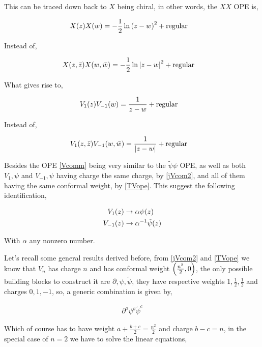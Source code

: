 This can be traced down back to $X$ being chiral, in other words, the $XX$ OPE is,

\begin{align*}
    X\qty(z)X\qty(w)&=-\frac12\ln\qty(z-w)^2+\textnormal{regular}
\end{align*}

Instead of,

\begin{align*}
    X\qty(z,\bar z)X\qty(w,\bar w)&=-\frac12\ln\abs{z-w}^2+\textnormal{regular}
\end{align*}

What gives rise to,

\begin{align*}
    V_1\qty(z)V_{-1}\qty(w)&=\frac{1}{z-w}+\textnormal{regular}
\end{align*}

Instead of,

\begin{align*}
    V_1\qty(z,\bar z)V_{-1}\qty(w,\bar w)&=\frac{1}{\abs{z-w}}+\textnormal{regular}
\end{align*}

Besides the OPE \ref{Vcomm} being very similar to the $\tilde\psi\psi$ OPE, as well as 
both $V_1,\psi$ and $V_{-1},\psi$ having charge the same charge, by \ref{jVcom2}, and all of them having the same conformal weight, 
by \ref{TVope}. This suggest the following identification,

\begin{align*}
    V_1\qty(z)&\rightarrow\alpha\psi\qty(z)\\
    V_{-1}\qty(z)&\rightarrow\alpha^{-1}\tilde\psi\qty(z)
\end{align*}

With $\alpha$ any nonzero number.

\probitem{}

Let's recall some general results derived before, from \ref{jVcom2} and \ref{TVope} we know that $V_n$ has 
charge $n$ and has conformal weight $\qty(\frac{n^2}{2},0)$, the only possible building blocks to construct it 
are $\partial,\psi,\tilde\psi$, they have respective weights $1,\frac12,\frac12$ and charges $0,1,-1$, so, a generic 
combination is given by,

\begin{align*}
    \partial^a\psi^b{\tilde\psi}^c
\end{align*}

Which of course has to have weight $a+\frac{b+c}{2}=\frac{n^2}{2}$ and charge $b-c=n$, in the special case of $n=2$ we have 
to solve the linear equations,

